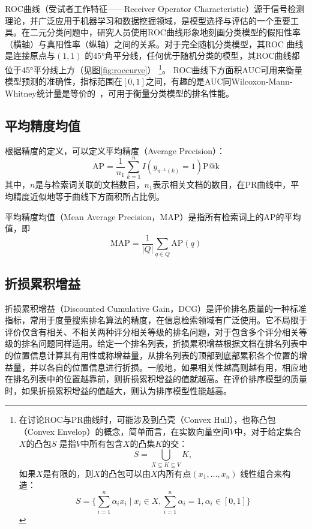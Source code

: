 ROC曲线（受试者工作特征——Receiver Operator Characteristic）源于信号检测理论，并广泛应用于机器学习和数据挖掘领域，是模型选择与评估的一个重要工具。在二元分类问题中，研究人员使用ROC曲线形象地刻画分类模型的假阳性率（横轴）与真阳性率（纵轴）之间的关系。对于完全随机分类模型，其ROC 曲线是连接原点与$(1,1)$ 的45°角平分线，任何优于随机分类的模型，其ROC曲线都位于45°平分线上方（见图\ref{fig:roccurve}）
\footnote{在讨论ROC与PR曲线时，可能涉及到凸壳（Convex Hull），也称凸包（Convex Envelop）的概念，简单而言，在实数向量空间$V$中，对于给定集合$X$的凸包$S$ 是指$V$中所有包含$X$的凸集$K$的交：\[S = \bigcup\limits_{X\subseteq K \subseteq V} K,\]如果$X$是有限的，则$X$的凸包可以由$X$内所有点$(x_1,\ldots,x_n)$ 线性组合来构造：\[S = \{\sum\limits_{i = 1}^n \alpha_i x_i \mid x_i\in X, \sum\limits_{i = 1}^n \alpha_i = 1, \alpha_i \in [0,1]\}\]}。
ROC曲线下方面积AUC\cite{bradley1997use}可用来衡量模型预测的准确性，指标范围在$[0,1]$之间，有趣的是AUC同Wilcoxon-Mann-Whitney统计量是等价的~\cite{hanely1982meaning}，可用于衡量分类模型的排名性能。

\subsection{平均精度均值}
根据精度的定义，可以定义平均精度（Average Precision）：
\begin{equation}\label{eq:ap}
    \text{AP}=\frac{1}{n_1} \sum_{k=1}^{n}{I(y_{\pi^{-1}(k)}=1)\text{P@k}}
\end{equation}
其中，$n$是与检索词关联的文档数目，$n_1$表示相关文档的数目，在PR曲线中，平均精度近似地等于曲线下方面积所占比例。

平均精度均值（Mean Average Precision，MAP）是指所有检索词上的AP的平均值，即
\begin{equation}\label{eq:map}
    \text{MAP} = \frac{1}{|Q|}\sum_{q\in Q}{\text{AP}(q)}
\end{equation}

\subsection{折损累积增益}
折损累积增益（Discounted Cumulative Gain，DCG）是评价排名质量的一种标准指标，常用于度量搜索排名算法的精度，在信息检索领域有广泛使用。它不局限于评价仅含有相关、不相关两种评分相关等级的排名问题，对于包含多个评分相关等级的排名问题同样适用。给定一个排名列表，折损累积增益根据文档在排名列表中的位置信息计算其有用性或称增益量，从排名列表的顶部到底部累积各个位置的增益量，并以各自的位置信息进行折损。一般地，如果相关性越高则越有用，相应地在排名列表中的位置越靠前，则折损累积增益的值就越高。在评价排序模型的质量时，如果折损累积增益的值越大，则认为排序模型性能越高。

